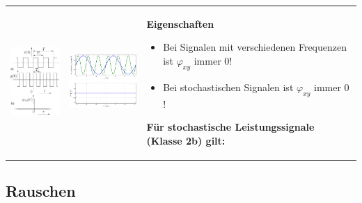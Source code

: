 		\begin{tabularx}{\textwidth}{llX}
		\parbox{2.9cm}{
			\includegraphics[width=2.9cm]{./bilder/kkf1.png}
		} 
		&
		\parbox{3.9cm}{
			\includegraphics[width=3.9cm]{./bilder/kkf2.png}
		} 
		&
		\parbox{10cm}{
			\textbf{Eigenschaften}
			\begin{itemize}
     			\item Bei Signalen mit verschiedenen Frequenzen ist $\varphi_{xy}$ immer $0$!
     			\item Bei stochastischen Signalen ist $\varphi_{xy}$ immer $0$!
   			\end{itemize}
   			
   			\textbf{Für stochastische Leistungssignale (Klasse 2b) gilt:} \\
   			\\
   		} \\
		\end{tabularx}
		
		
	\subsection{Rauschen  }
	
